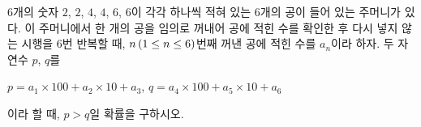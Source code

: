 $6$개의 숫자 $2$, $2$, $4$, $4$, $6$, $6$이 각각 하나씩 적혀 있는 $6$개의 공이 들어 있는 주머니가 있다. 이 주머니에서 한 개의 공을 임의로 꺼내어 공에 적힌 수를 확인한 후 다시 넣지 않는 시행을 $6$번 반복할 때, $n\mkern3mu (1\le n\le 6)$번째 꺼낸 공에 적힌 수를 $a_n$이라 하자. 두 자연수 $p$, $q$를\par\smallskip\noindent\hspace*{1.5em}$p=a_1\times 100+a_2\times 10+a_3$, $q=a_4\times 100+a_5\times 10+a_6$\par\smallskip\noindent 이라 할 때, $p>q$일 확률을 구하시오.
